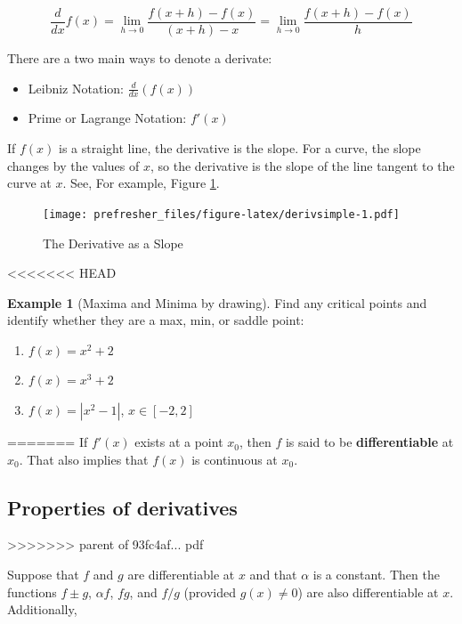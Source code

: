 \documentclass[]{book}
\providecommand{\tightlist}{%
  \setlength{\itemsep}{0pt}\setlength{\parskip}{0pt}}
\theoremstyle{definition}
\theoremstyle{definition}
\newtheorem{example}{Example}[chapter]
\theoremstyle{definition}
\theoremstyle{remark}
\begin{document}
\[\frac{d}{dx}f(x) =\lim\limits_{h\to 0} \frac{f(x+h)-f(x)}{(x+h)-x} = \lim\limits_{h\to 0} \frac{f(x+h)-f(x)}{h}
\]

There are a two main ways to denote a derivate:

\begin{itemize}
\tightlist
\item
  Leibniz Notation: \(\frac{d}{dx}(f(x))\)
\item
  Prime or Lagrange Notation: \(f'(x)\)
\end{itemize}

If \(f(x)\) is a straight line, the derivative is the slope. For a curve, the slope changes by the values of \(x\), so the derivative is the slope of the line tangent to the curve at \(x\). See, For example, Figure \ref{fig:derivsimple}.

\begin{figure}
\centering
\texttt{[image: prefresher\_files/figure-latex/derivsimple-1.pdf]}
\caption{\label{fig:derivsimple}The Derivative as a Slope}
\end{figure}

<<<<<<< HEAD
\begin{example}[Maxima and Minima by drawing]
\protect\hypertarget{exm:unnamed-chunk-46}{}{\label{exm:unnamed-chunk-46} {} }
Find any critical points and identify whether they are a max, min, or saddle point:

\begin{enumerate}
\def\labelenumi{\arabic{enumi}.}
\tightlist
\item
  \(f(x)=x^2+2\)
\item
  \(f(x)=x^3+2\)
\item
  \(f(x)=|x^2-1|\), \(x\in [-2,2]\)
\end{enumerate}
\end{example}
=======
If \(f'(x)\) exists at a point \(x_0\), then \(f\) is said to be \textbf{differentiable} at \(x_0\). That also implies that \(f(x)\) is continuous at \(x_0\).

\hypertarget{properties-of-derivatives}{%
\subsection*{Properties of derivatives}\label{properties-of-derivatives}}
>>>>>>> parent of 93fc4af... pdf

Suppose that \(f\) and \(g\) are differentiable at \(x\) and that \(\alpha\) is a constant. Then the functions \(f\pm g\), \(\alpha f\), \(f g\), and \(f/g\) (provided \(g(x)\ne 0\)) are also differentiable at \(x\). Additionally,
\end{document}
